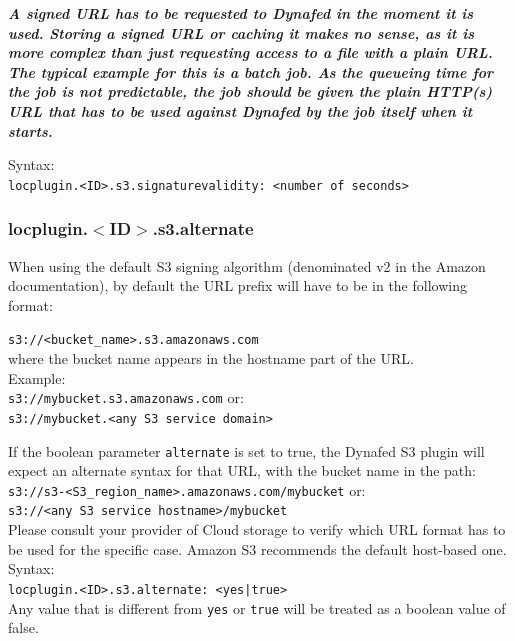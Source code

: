 \documentclass[12pt]{article} %
\begin{document}
\textit{\textbf{A signed URL has to be requested to Dynafed in the moment it is used. Storing a signed URL or caching it makes no sense, as it
is more complex than just requesting access to a file with a plain URL.\\
The typical example for this is a batch job. As the queueing time for the job is not predictable, the job should
be given the plain HTTP(s) URL that has to be used against Dynafed by the job itself when it starts.\\}}

Syntax:\\
\lstinline"locplugin.<ID>.s3.signaturevalidity: <number of seconds>"\\

\subsubsection{locplugin.$<$ID$>$.s3.alternate}
When using the default S3 signing algorithm (denominated v2 in the Amazon documentation), by default the URL prefix will have to be in the following format:

\lstinline"s3://<bucket_name>.s3.amazonaws.com"\\

where the bucket name appears in the hostname part of the URL.\\

Example:\\

\lstinline"s3://mybucket.s3.amazonaws.com"    or: \\
\lstinline"s3://mybucket.<any S3 service domain>"

 
If the boolean parameter \lstinline"alternate" is set to true, the Dynafed S3 plugin
will expect an alternate syntax for that URL, with the bucket name in the path:\\
 
\lstinline"s3://s3-<S3_region_name>.amazonaws.com/mybucket"    or: \\
\lstinline"s3://<any S3 service hostname>/mybucket"\\

Please consult your provider of Cloud storage to verify which URL format has to be used for the specific case. Amazon S3 recommends the default host-based one.\\

Syntax:\\
\lstinline"locplugin.<ID>.s3.alternate: <yes|true>"\\
Any value that is different from \lstinline"yes" or \lstinline"true" will be treated as a boolean value of false.\\
\end{document}
